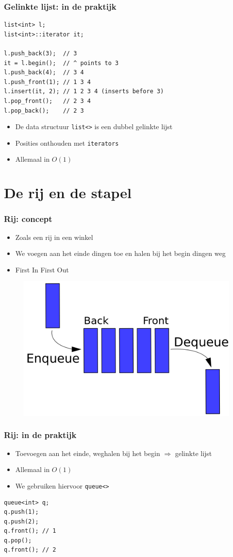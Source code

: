\documentclass[12pt]{beamer}
\begin{document}
\begin{frame}[fragile]
\frametitle{Gelinkte lijst: in de praktijk}
\begin{lstlisting}
list<int> l;
list<int>::iterator it;

l.push_back(3);  // 3
it = l.begin();  // ^ points to 3
l.push_back(4);  // 3 4
l.push_front(1); // 1 3 4
l.insert(it, 2); // 1 2 3 4 (inserts before 3)
l.pop_front();   // 2 3 4
l.pop_back();    // 2 3
\end{lstlisting}
\begin{itemize}
\item De data structuur \texttt{list<>} is een dubbel gelinkte lijst
\item Posities onthouden met \texttt{iterators}
\item Allemaal in $O(1)$
\end{itemize}
\end{frame}

\section{De rij en de stapel}

\begin{frame}
\frametitle{Rij: concept}
\begin{itemize}
\item Zoals een rij in een winkel
\item We voegen aan het einde dingen toe en halen bij het begin dingen weg
\item  First In First Out
\end{itemize}
\begin{figure}
\centering
\includegraphics[width=.6\textwidth]{img/queue}
\end{figure}
\end{frame}

\begin{frame}[fragile]
\frametitle{Rij: in de praktijk}
\begin{itemize}
\item Toevoegen aan het einde, weghalen bij het begin $\Rightarrow$ gelinkte lijst
\item Allemaal in $O(1)$
\item We gebruiken hiervoor \texttt{queue<>}
\end{itemize}
\begin{lstlisting}
queue<int> q;
q.push(1);
q.push(2);
q.front(); // 1
q.pop();
q.front(); // 2
\end{lstlisting}
\end{frame}
\end{document}
